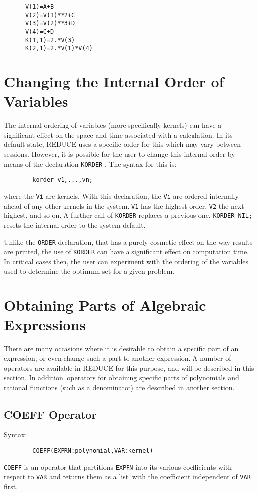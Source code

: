 \documentclass[11pt,letterpaper]{book}
\makeatletter
\newcommand{\REDUCE}{REDUCE}
\newcommand{\underscore}{\_}
\newcommand{\ttindex}[1]{{\renewcommand{\_}{\protect\underscore}%
                          \index{#1@{\tt #1}}}}
\makeatother
\begin{document}
{\small\begin{verbatim}
      V(1)=A+B
      V(2)=V(1)**2+C
      V(3)=V(2)**3+D
      V(4)=C+D
      K(1,1)=2.*V(3)
      K(2,1)=2.*V(1)*V(4)
\end{verbatim}}

\section{Changing the Internal Order of Variables}

The internal ordering of variables (more specifically kernels) can have
a significant effect on the space and time associated with a calculation.
In its default state, {\REDUCE} uses a specific order for this which may
vary between sessions.  However, it is possible for the user to change
this internal order by means of the declaration
{\tt KORDER}\ttindex{KORDER}.  The syntax for this is:
{\small\begin{verbatim}
        korder v1,...,vn;
\end{verbatim}}
where the {\tt Vi} are kernels.  With this declaration, the
{\tt Vi} are ordered internally ahead of any other kernels in the system.
{\tt V1} has the highest order, {\tt V2} the next highest, and so on.  A
further call of {\tt KORDER} replaces a previous one. {\tt KORDER NIL;}
resets the internal order to the system default.

Unlike the {\tt ORDER}\ttindex{ORDER} declaration, that has a purely
cosmetic effect on the way results are printed, the use of {\tt KORDER}
can have a significant effect on computation time.  In critical cases
then, the user can experiment with the ordering of the variables used to
determine the optimum set for a given problem.

\section{Obtaining Parts of Algebraic Expressions}

There are many occasions where it is desirable to obtain a specific part
of an expression, or even change such a part to another expression. A
number of operators are available in {\REDUCE} for this purpose, and will be
described in this section. In addition, operators for obtaining specific
parts of polynomials and rational functions (such as a denominator) are
described in another section.

\subsection{COEFF Operator}\ttindex{COEFF}
Syntax:
{\small\begin{verbatim}
        COEFF(EXPRN:polynomial,VAR:kernel)
\end{verbatim}}
{\tt COEFF} is an operator that partitions {\tt EXPRN} into its various
coefficients with respect to {\tt VAR} and returns them as a list, with
the coefficient independent of {\tt VAR} first.
\end{document}
